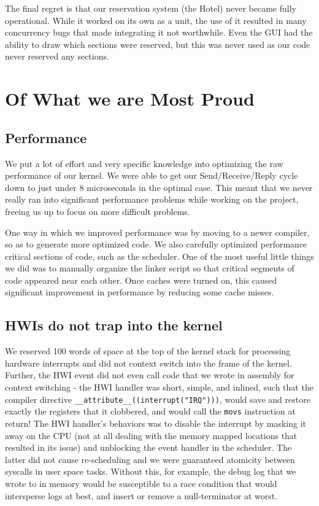 \documentclass{amsart} \usepackage{amsmath} \usepackage{upgreek}
\newcommand{\x}[1]{\texttt{#1}}
\begin{document}
The final regret is that our reservation system (the Hotel) never became fully
operational. While it worked on its own as a unit, the use of it resulted in
many concurrency bugs that made integrating it not worthwhile. Even the GUI had
the ability to draw which sections were reserved, but this was never used as our
code never reserved any sections.

\section*{Of What we are Most Proud}

\subsection*{Performance}

We put a lot of effort and very specific knowledge into optimizing the raw
performance of our kernel. We were able to get our Send/Receive/Reply cycle down
to just under 8 microseconds in the optimal case. This meant that we never
really ran into significant performance problems while working on the project,
freeing us up to focus on more difficult problems.

One way in which we improved performance was by moving to a newer compiler, so
as to generate more optimized code. We also carefully optimized performance
critical sections of code, such as the scheduler. One of the most useful little
things we did was to manually organize the linker script so that critical
segments of code appeared near each other. Once caches were turned on, this
caused significant improvement in performance by reducing some cache misses.

\subsection*{HWIs do not trap into the kernel}

We reserved 100 words of space at the top of the kernel stack for processing
hardware interrupts and did not context switch into the frame of the kernel.
Further, the HWI event did not even call code that we wrote in assembly for
context switching - the HWI handler was short, simple, and inlined, such that
the compiler directive \x{\_\_attribute\_\_((interrupt("IRQ")))}, would save and
restore exactly the registers that it clobbered, and would call the \x{movs}
instruction at return!  The HWI handler's behaviors was to disable the interrupt
by masking it away on the CPU (not at all dealing with the memory mapped
locations that resulted in its issue) and unblocking the event handler in the
scheduler. The latter did not cause re-scheduling and we were guaranteed
atomicity between syscalls in user space tasks. Without this, for example, the
debug log that we wrote to in memory would be susceptible to a race condition
that would intersperse logs at best, and insert or remove a null-terminator at
worst.
\end{document}
